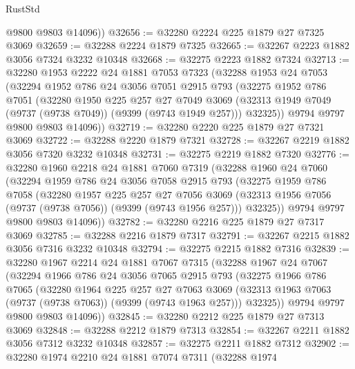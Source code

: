 \begin{lexlean}{RustStd}
\begin{coremodule}
        @9800
        @9803
        @14096))
@32656 := @32280 @2224 @225 @1879 @27 @7325 @3069
@32659 := @32288 @2224 @1879 @7325
@32665 := @32267 @2223 @1882 @3056 @7324 @3232 @10348
@32668 := @32275 @2223 @1882 @7324
@32713 := @32280
    @1953
    @2222
    @24
    @1881
    @7053
    @7323
    (@32288
      @1953
      @24
      @7053
      (@32294
        @1952
        @786
        @24
        @3056
        @7051
        @2915
        @793
        (@32275
          @1952
          @786
          @7051
          (@32280
            @1950
            @225
            @257
            @27
            @7049
            @3069
            (@32313 @1949 @7049 (@9737 (@9738 @7049)) (@9399 (@9743 @1949 @257)))
            @32325))
        @9794
        @9797
        @9800
        @9803
        @14096))
@32719 := @32280 @2220 @225 @1879 @27 @7321 @3069
@32722 := @32288 @2220 @1879 @7321
@32728 := @32267 @2219 @1882 @3056 @7320 @3232 @10348
@32731 := @32275 @2219 @1882 @7320
@32776 := @32280
    @1960
    @2218
    @24
    @1881
    @7060
    @7319
    (@32288
      @1960
      @24
      @7060
      (@32294
        @1959
        @786
        @24
        @3056
        @7058
        @2915
        @793
        (@32275
          @1959
          @786
          @7058
          (@32280
            @1957
            @225
            @257
            @27
            @7056
            @3069
            (@32313 @1956 @7056 (@9737 (@9738 @7056)) (@9399 (@9743 @1956 @257)))
            @32325))
        @9794
        @9797
        @9800
        @9803
        @14096))
@32782 := @32280 @2216 @225 @1879 @27 @7317 @3069
@32785 := @32288 @2216 @1879 @7317
@32791 := @32267 @2215 @1882 @3056 @7316 @3232 @10348
@32794 := @32275 @2215 @1882 @7316
@32839 := @32280
    @1967
    @2214
    @24
    @1881
    @7067
    @7315
    (@32288
      @1967
      @24
      @7067
      (@32294
        @1966
        @786
        @24
        @3056
        @7065
        @2915
        @793
        (@32275
          @1966
          @786
          @7065
          (@32280
            @1964
            @225
            @257
            @27
            @7063
            @3069
            (@32313 @1963 @7063 (@9737 (@9738 @7063)) (@9399 (@9743 @1963 @257)))
            @32325))
        @9794
        @9797
        @9800
        @9803
        @14096))
@32845 := @32280 @2212 @225 @1879 @27 @7313 @3069
@32848 := @32288 @2212 @1879 @7313
@32854 := @32267 @2211 @1882 @3056 @7312 @3232 @10348
@32857 := @32275 @2211 @1882 @7312
@32902 := @32280
    @1974
    @2210
    @24
    @1881
    @7074
    @7311
    (@32288
      @1974

\end{coremodule}
\end{lexlean}

